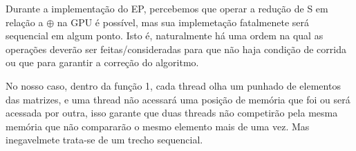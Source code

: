 \documentclass[11pt]{article}
\begin{document}
Durante a implementação do EP, percebemos que operar a redução de S em relação a $\oplus$ na GPU é possível, mas sua implemetação fatalmenete será sequencial em algum ponto. Isto é, naturalmente há uma ordem na qual as operações deverão ser feitas/consideradas para que não haja condição de corrida ou que para garantir a correção do algoritmo.

No nosso caso, dentro da função 1, cada thread olha um punhado de elementos das matrizes, e uma thread não acessará uma posição de memória que foi ou será acessada por outra, isso garante que duas threads não competirão pela mesma memória que não compararão o mesmo elemento mais de uma vez. Mas inegavelmete trata-se de um trecho sequencial. 
\end{document}
